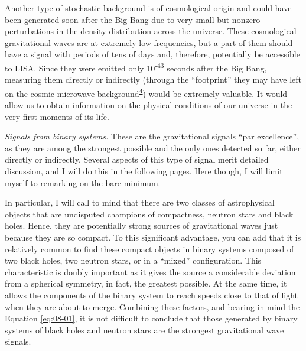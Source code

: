 Another type of stochastic background is of cosmological origin and could have been
generated soon after the Big Bang due to very small but nonzero perturbations in the
density distribution across the universe. These cosmological gravitational waves are at
extremely low frequencies, but a part of them should have a signal with periods of tens
of days and, therefore, potentially be accessible to LISA. Since they were emitted only
10\textsuperscript{-43} seconds after the Big Bang, measuring them directly or
indirectly (through the ``footprint'' they may have left on the cosmic
microwave background\textsuperscript{\hyperlink{note:08-04}{4}}) would be extremely valuable.
It would allow us to obtain information on the physical conditions of our universe in
the very first moments of its life.

\emph{Signals from binary systems.} These are the gravitational signals ``par
excellence'', as they are among the strongest possible and the only ones detected so
far, either directly or indirectly. Several aspects of this type of signal merit
detailed discussion, and I will do this in the following pages. Here though, I will
limit myself to remarking on the bare minimum.

In particular, I will call to mind that there are two classes of astrophysical objects
that are undisputed champions of compactness,
neutron stars and black holes. Hence, they are potentially strong sources of
gravitational waves just because they are so compact. To this significant advantage, you
can add that it is relatively common to find these compact objects in binary systems
composed of two black holes, two neutron stars, or in a ``mixed'' configuration. This
characteristic is doubly important as it gives the source a considerable deviation from
a spherical symmetry, in fact, the greatest possible. At the same
time, it allows the components of the binary system to reach speeds close to that of
light when they are about to merge. Combining these factors, and bearing in mind the
Equation \eqref{eq:08-01}, it is not difficult to conclude that those generated by binary systems
of black holes and neutron stars are the strongest gravitational wave
signals.

